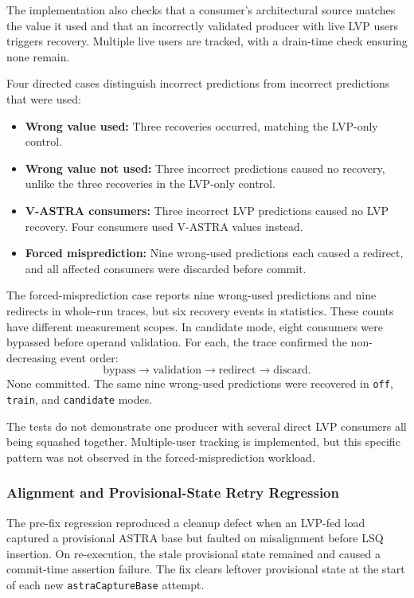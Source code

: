 The implementation also checks that a consumer's architectural source
matches the value it used and that an incorrectly validated producer
with live LVP users triggers recovery. Multiple live users are tracked,
with a drain-time check ensuring none remain.

Four directed cases distinguish incorrect predictions from incorrect
predictions that were used:
\begin{itemize}
    \item \textbf{Wrong value used:} Three recoveries occurred, matching
    the LVP-only control.

    \item \textbf{Wrong value not used:} Three incorrect predictions
    caused no recovery, unlike the three recoveries in the LVP-only
    control.

    \item \textbf{V-ASTRA consumers:} Three incorrect LVP predictions
    caused no LVP recovery. Four consumers used V-ASTRA values instead.

    \item \textbf{Forced misprediction:} Nine wrong-used predictions
    each caused a redirect, and all affected consumers were discarded
    before commit.
\end{itemize}

The forced-misprediction case reports nine wrong-used predictions and
nine redirects in whole-run traces, but six recovery events in statistics. These counts have different measurement scopes. In
candidate mode, eight consumers were bypassed before operand
validation. For each, the trace confirmed the non-decreasing event
order:
\[
\text{bypass} \rightarrow \text{validation} \rightarrow
\text{redirect} \rightarrow \text{discard}.
\]
None committed. The same nine wrong-used predictions were recovered
in \texttt{off}, \texttt{train}, and \texttt{candidate} modes.

The tests do not demonstrate one producer with several direct LVP
consumers all being squashed together. Multiple-user tracking is
implemented, but this specific pattern was not observed in the
forced-misprediction workload.

\subsubsection{Alignment and Provisional-State Retry Regression}
\label{subsubsec:meta-alignment-retry}

The pre-fix regression reproduced a cleanup defect when an LVP-fed
load captured a provisional ASTRA base but faulted on misalignment
before LSQ insertion. On re-execution, the stale provisional state
remained and caused a commit-time assertion failure. The fix clears
leftover provisional state at the start of each new
\texttt{astraCaptureBase} attempt.

